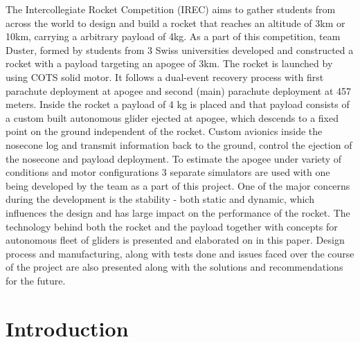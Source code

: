 \documentclass[]{iac}
\begin{document}
{The Intercollegiate Rocket Competition (IREC) aims to gather students from across the world to design and build a rocket that reaches an altitude of 3km or 10km, carrying a arbitrary payload of 4kg. As a part of this competition, team Duster, formed by students from 3 Swiss universities developed and constructed a rocket with a payload targeting an apogee of 3km. The rocket is launched by using COTS solid motor. It follows a dual-event recovery process with first parachute deployment at apogee and second (main) parachute deployment at 457 meters.
Inside the rocket a payload of 4 kg is placed and that payload consists of a custom built autonomous glider ejected at apogee, which descends to a fixed point on the ground independent of the rocket.   Custom avionics inside the nosecone log and transmit information back to the ground, control the ejection of the nosecone and payload deployment. 
To estimate the apogee under variety of conditions and motor configurations 3 separate simulators are used with one being developed by the team as a part of this project. One of the major concerns during the development is the stability - both static and dynamic, which influences the design and has large impact on the performance of the rocket. 
The technology behind both the rocket and the payload together with concepts for autonomous fleet of gliders is presented and elaborated on in this paper. Design process and manufacturing, along with tests done and issues faced over the course of the project are also presented along with the solutions and recommendations for the future.
}

\maketitle
\section{Introduction}


\end{document}
